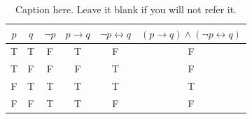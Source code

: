 \documentclass[12pt,letterpaper]{article}
\begin{document}
\begin{table}[h]    %
\caption{Caption here. Leave it blank if you will not refer it.}
\label{tb_truth_table}
    \centering  %
    \begin{tabular}{cc|c|cc|c} %

        $p$ &   $q$ &   $\neg p$    &   $p \rightarrow q$  &   $\neg p \leftrightarrow q$  &   $(p \rightarrow q) \wedge (\neg p \leftrightarrow q)$ \\ \hline
        T   &   T   &   F           &   T                   &   F                           &   F   \\
        T   &   F   &   F           &   F                   &   T                           &   F   \\
        F   &   T   &   T           &   T                   &   T                           &   T   \\
        F   &   F   &   T           &   T                   &   F                           &   F   
    \end{tabular}
\end{table}
\end{document}
